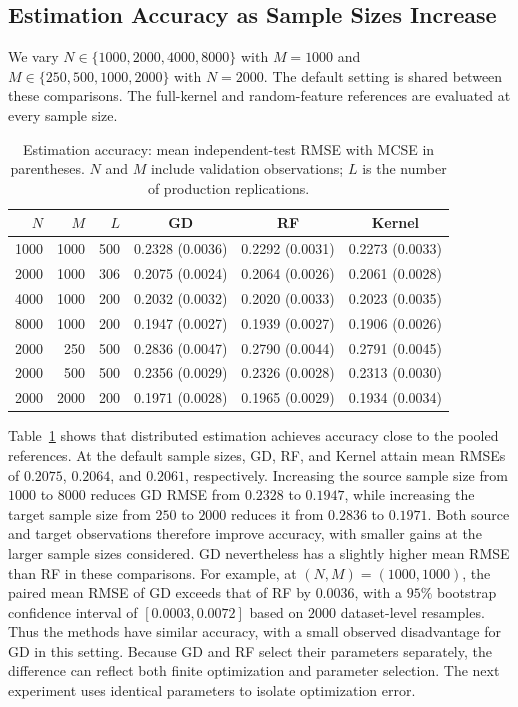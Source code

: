\subsection{Estimation Accuracy as Sample Sizes Increase}
\label{Sec: simulation-accuracy}

We vary $N\in\{1000,2000,4000,8000\}$ with $M=1000$ and
$M\in\{250,500,1000,2000\}$ with $N=2000$. The default setting is shared
between these comparisons. The full-kernel and random-feature references
are evaluated at every sample size.

\begin{table}[htbp]
\centering
\caption{Estimation accuracy: mean independent-test RMSE with MCSE in
parentheses. $N$ and $M$ include validation observations; $L$ is the number
of production replications.}
\label{tab:simulation-accuracy}
\small
\begin{tabular}{rrrccc}
\toprule
$N$ & $M$ & $L$ & GD & RF & Kernel \\
\midrule
1000 & 1000 & 500 & 0.2328 (0.0036) & 0.2292 (0.0031) & 0.2273 (0.0033) \\
2000 & 1000 & 306 & 0.2075 (0.0024) & 0.2064 (0.0026) & 0.2061 (0.0028) \\
4000 & 1000 & 200 & 0.2032 (0.0032) & 0.2020 (0.0033) & 0.2023 (0.0035) \\
8000 & 1000 & 200 & 0.1947 (0.0027) & 0.1939 (0.0027) & 0.1906 (0.0026) \\
\midrule
2000 & 250  & 500 & 0.2836 (0.0047) & 0.2790 (0.0044) & 0.2791 (0.0045) \\
2000 & 500  & 500 & 0.2356 (0.0029) & 0.2326 (0.0028) & 0.2313 (0.0030) \\
2000 & 2000 & 200 & 0.1971 (0.0028) & 0.1965 (0.0029) & 0.1934 (0.0034) \\
\bottomrule
\end{tabular}
\end{table}

Table~\ref{tab:simulation-accuracy} shows that distributed estimation achieves
accuracy close to the pooled references. At the default sample sizes, GD,
RF, and Kernel attain mean RMSEs of $0.2075$, $0.2064$, and $0.2061$,
respectively. Increasing the source sample size from $1000$ to $8000$
reduces GD RMSE from $0.2328$ to $0.1947$, while increasing the target
sample size from $250$ to $2000$ reduces it from $0.2836$ to $0.1971$.
Both source and target observations therefore improve accuracy, with smaller
gains at the larger sample sizes considered. GD nevertheless has a slightly
higher mean RMSE than RF in these comparisons. For example, at
$(N,M)=(1000,1000)$, the paired mean RMSE of GD exceeds that of RF by
$0.0036$, with a $95\%$ bootstrap confidence interval of
$[0.0003,0.0072]$ based on $2000$ dataset-level resamples. Thus the methods
have similar accuracy, with a small observed disadvantage for GD in this
setting. Because GD and RF select their parameters separately, the difference
can reflect both finite optimization and parameter selection. The next
experiment uses identical parameters to isolate optimization error.


